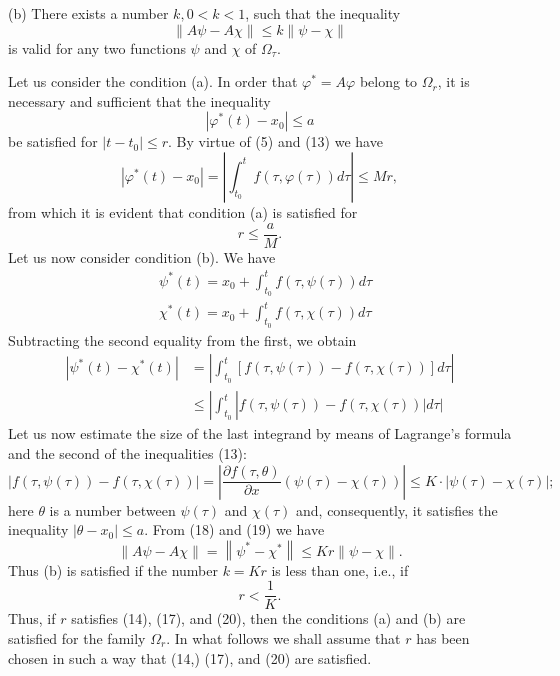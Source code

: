 \documentclass[10pt,a5paper]{book}
\makeatletter
\theoremstyle{plain}
\theoremstyle{definition}
\theoremstyle{remark}
\renewenvironment{proof}[1][\proofname]{\par
  \pushQED{\qed}%
  \normalfont\topsep6\p@\@plus6\p@\relax
  \trivlist
  \item\relax{\itshape #1\@addpunct{.}}\hspace\labelsep\ignorespaces
}{\popQED\endtrivlist\@endpefalse}
\makeatother
\begin{document}
\begin{proof}[Proof of Theorem 1]
(b) There exists a number $k, 0<k<1$, such that the inequality
\begin{equation*}
\|A \psi-A \chi\| \leq k\|\psi-\chi\| \tag{16}
\end{equation*}
is valid for any two functions $\psi$ and $\chi$ of $\Omega_{\tau}$.

Let us consider the condition (a). In order that $\varphi^{*}=A \varphi$ belong to $\Omega_{r}$, it is necessary and sufficient that the inequality
\[
\left|\varphi^{*}(t)-x_{0}\right| \leq a
\]
be satisfied for $\left|t-t_{0}\right| \leq r$. By virtue of (5) and (13) we have
\[
\left|\varphi^{*}(t)-x_{0}\right|=\left|\int_{t_{0}}^{t} f(\tau, \varphi(\tau)) d \tau\right| \leq M r,
\]
from which it is evident that condition (a) is satisfied for
\begin{equation*}
r \leq \frac{a}{M} . \tag{17}
\end{equation*}
Let us now consider condition (b). We have
\[
\begin{aligned}
& \psi^{*}(t)=x_{0}+\int_{t_{0}}^{t} f(\tau, \psi(\tau)) d \tau \\
& \chi^{*}(t)=x_{0}+\int_{t_{0}}^{t} f(\tau, \chi(\tau)) d \tau
\end{aligned}
\]
Subtracting the second equality from the first, we obtain
\begin{align*}
\left|\psi^{*}(t)-\chi^{*}(t)\right| & =\left|\int_{t_{0}}^{t}[f(\tau, \psi(\tau))-f(\tau, \chi(\tau))] d \tau\right| \\
& \leq\left|\int_{t_{0}}^{t}\right| f(\tau, \psi(\tau))-f(\tau, \chi(\tau))|d \tau| \tag{18}
\end{align*}
Let us now estimate the size of the last integrand by means of Lagrange's formula and the second of the inequalities (13):
\begin{equation*}
|f(\tau, \psi(\tau))-f(\tau, \chi(\tau))|=\left|\frac{\partial f(\tau, \theta)}{\partial x}(\psi(\tau)-\chi(\tau))\right| \leq K \cdot|\psi(\tau)-\chi(\tau)| ; \tag{19}
\end{equation*}
here $\theta$ is a number between $\psi(\tau)$ and $\chi(\tau)$ and, consequently, it satisfies the inequality $\left|\theta-x_{0}\right| \leq a$. From (18) and (19) we have
\[
\|A \psi-A \chi\|=\left\|\psi^{*}-\chi^{*}\right\| \leq K r\|\psi-\chi\| .
\]
Thus (b) is satisfied if the number $k=K r$ is less than one, i.e., if
\begin{equation*}
r<\frac{1}{K} . \tag{20}
\end{equation*}
Thus, if $r$ satisfies (14), (17), and (20), then the conditions (a) and (b) are satisfied for the family $\Omega_{r}$. In what follows we shall assume that $r$ has been chosen in such a way that (14,) (17), and (20) are satisfied.


\end{proof}
\end{document}
